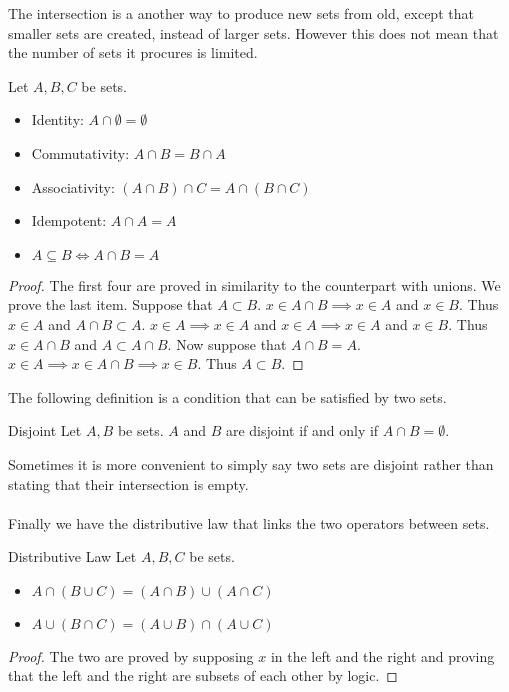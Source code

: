 \documentclass[a4paper]{article}
\begin{document}
The intersection is a another way to produce new sets from old, except that smaller sets are created, instead of larger sets. However this does not mean that the number of sets it procures is limited. 

\begin{prp}{}{} Let $A,B,C$ be sets. 
\begin{itemize}
\item Identity: $A\cap\emptyset=\emptyset$
\item Commutativity: $A\cap B=B\cap A$
\item Associativity: $(A\cap B)\cap C=A\cap(B\cap C)$
\item Idempotent: $A\cap A=A$
\item $A\subseteq B\iff A\cap B=A$
\end{itemize}\tcbline
\begin{proof} The first four are proved in similarity to the counterpart with unions. We prove the last item. Suppose that $A\subset B$. $x\in A\cap B\implies x\in A$ and $x\in B$. Thus $x\in A$ and $A\cap B\subset A$. $x\in A\implies x\in A$ and $x\in A\implies x\in A$ and $x\in B$. Thus $x\in A\cap B$ and $A\subset A\cap B$. Now suppose that $A\cap B=A$. $x\in A\implies x\in A\cap B\implies x\in B$. Thus $A\subset B$. 
\end{proof}
\end{prp}

The following definition is a condition that can be satisfied by two sets. 

\begin{defn}{Disjoint}{} Let $A,B$ be sets. $A$ and $B$ are disjoint if and only if $A\cap B=\emptyset$. 
\end{defn}

Sometimes it is more convenient to simply say two sets are disjoint rather than stating that their intersection is empty. \\~\\

Finally we have the distributive law that links the two operators between sets. 

\begin{thm}{Distributive Law}{} Let $A,B,C$ be sets. 
\begin{itemize}
\item $A\cap(B\cup C)=(A\cap B)\cup(A\cap C)$
\item $A\cup(B\cap C)=(A\cup B)\cap(A\cup C)$
\end{itemize}\tcbline
\begin{proof} The two are proved by supposing $x$ in the left and the right and proving that the left and the right are subsets of each other by logic. 
\end{proof}
\end{thm}
\end{document}
